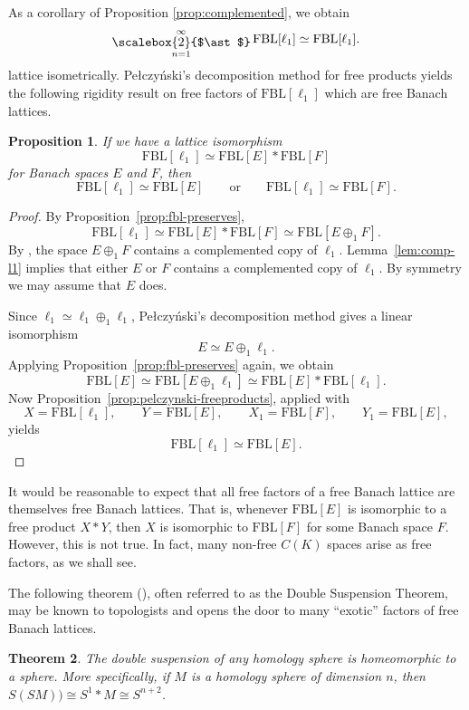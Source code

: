 \documentclass[12pt]{amsart}
\newcommand{\FBL}{\mathrm{FBL}}
\DeclareMathOperator*{\bigfree}{\raisebox{-0.6ex}{\scalebox{2}{$\ast$}}}
\theoremstyle{plain}
\newtheorem{theorem}{Theorem}[section]
\newtheorem{proposition}[theorem]{Proposition}
\theoremstyle{definition}
\begin{document}
As a corollary of Proposition \ref{prop:complemented},
we obtain
\[
\bigfree_{n=1}^\infty \FBL[\ell_1]
\simeq
\FBL[\ell_1].
\]
lattice isometrically. Pe\l czy\'nski's decomposition method for free products yields the following rigidity result on free factors of $\FBL[\ell_1]$ which are free Banach lattices.




\begin{proposition}\label{prop:prime-freebanach}
If we have a lattice isomorphism
\[
\FBL[\ell_1]\simeq \FBL[E]\ast \FBL[F]
\]
for Banach spaces $E$ and $F$, then
\[
\FBL[\ell_1]\simeq \FBL[E]
\qquad\text{or}\qquad
\FBL[\ell_1]\simeq \FBL[F].
\]
\end{proposition}

\begin{proof}
By Proposition~\ref{prop:fbl-preserves},
\[
\FBL[\ell_1]\simeq \FBL[E]\ast \FBL[F]\simeq \FBL[E\oplus_1 F].
\]
By \cite[Theorem~9.20]{freebanlat}, the space $E\oplus_1 F$ contains a complemented copy of $\ell_1$. Lemma~\ref{lem:comp-l1} implies that either $E$ or $F$ contains a complemented copy of $\ell_1$. By symmetry we may assume that $E$ does.

Since $\ell_1\simeq \ell_1\oplus_1\ell_1$, Pe\l czy\'nski's decomposition method \cite[Theorem~2.2.3]{albiackalton} gives a linear isomorphism
\[
E\simeq E\oplus_1 \ell_1.
\]
Applying Proposition~\ref{prop:fbl-preserves} again, we obtain
\[
\FBL[E]\simeq \FBL[E\oplus_1\ell_1]\simeq \FBL[E]\ast \FBL[\ell_1].
\]
Now Proposition~\ref{prop:pelczynski-freeproducts}, applied with
\[
X=\FBL[\ell_1],
\qquad
Y=\FBL[E],
\qquad
X_1=\FBL[F],
\qquad
Y_1=\FBL[E],
\]
yields
\[
\FBL[\ell_1]\simeq \FBL[E].
\]
\end{proof}

It would be reasonable to expect that all free factors of a free Banach lattice are themselves free Banach lattices. That is, whenever $\FBL[E]$ is isomorphic to a free product $X*Y$, then $X$ is isomorphic to $\FBL[F]$ for some Banach space $F$. However, this is not true. In fact, many non-free $C(K)$ spaces arise as free factors, as we shall see.

The following theorem (\cite[p.108]{Doublesusptheo}), often referred to as the Double Suspension Theorem, may be known to topologists and opens the door to many ``exotic'' factors of free Banach lattices.

\begin{theorem} The double suspension of any homology sphere is homeomorphic to a sphere. More specifically, if $M$ is a homology sphere of dimension $n$, then $S(SM))\cong S^1*M\cong S^{n+2}$.
\end{theorem}
\end{document}
